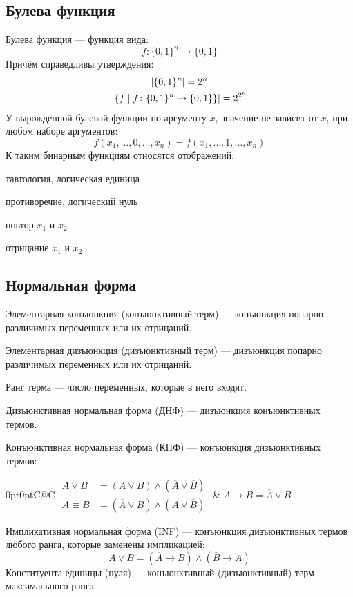 \subsection{Булева функция}

{\bold Булева функция} --- функция вида:
$$f\colon\{0,1\}^n\to\{0,1\}$$
Причём справедливы утверждения:
$$\begin{gathered}
\left|\{0,1\}^n\right|=2^n\\
\left|\{f\mid f\colon\{0,1\}^n\to\{0,1\}\}\right|=2^{2^n}
\end{gathered}$$
У {\bold вырожденной} булевой функции по аргументу $x_i$ значение {\ital не зависит} от $x_i$ при любом наборе аргументов:
$$f(x_1,\dots,0,\dots,x_n)=f(x_1,\dots,1,\dots,x_n)$$
К таким бинарным функциям относятся { отображений}:
\begin{list*}
\item {\bold тавтология}, логическая единица
\item {\bold противоречие}, логический нуль
\item {\bold повтор} $x_1$ и $x_2$
\item {\bold отрицание} $x_1$ и $x_2$
\end{list*}

\subsection{Нормальная форма}

{\bold Элементарная конъюнкция} {\ital (конъюнктивный терм)} --- конъюнкция попарно различимых переменных или их отрицаний.

{\bold Элементарная дизъюнкция} {\ital (дизъюнктивный терм)} --- дизъюнкция попарно различимых переменных или их отрицаний.

{\bold Ранг терма} --- число переменных, которые в него входят.

{\bold Дизъюнктивная нормальная форма} {\ital (ДНФ)} --- дизъюнкция конъюнктивных термов.

{\bold Конъюнктивная нормальная форма} {\ital (КНФ)} --- конъюнкция дизъюнктивных термов:
\begin{theorem}
\begin{tabularcx}{0pt}{0pt}{C@{\hspace*{-16pt}}C}{\textwidth}
$\begin{aligned}
A\dot{\lor}B&=(A\lor B)\land(\overline{A}\lor\overline{B})\\
A\equiv B&=(\overline{A}\lor B)\land(A\lor\overline{B})
\end{aligned}$\hspace*{-18pt} & $A\rightarrow B=\overline{A}\lor B$
\end{tabularcx}
\end{theorem}
{\bold Импликативная нормальная форма} {\ital (INF)} --- конъюнкция дизъюнктивных термов любого ранга, которые заменены импликацией:
$$A\lor B=(\overline{A}\rightarrow B)\land(\overline{B}\to A)$$
{\bold Конституента единицы} {\ital (нуля)} --- конъюнктивный {\ital (дизъюнктивный)} терм максимального ранга.

